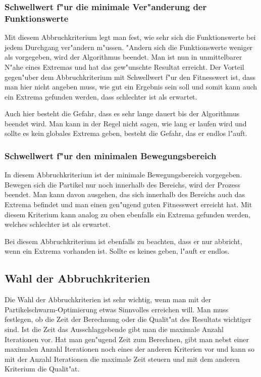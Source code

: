 \subsubsection{Schwellwert f"ur die minimale Ver"anderung der Funktionswerte}
Mit diesem Abbruchkriterium legt man fest, wie sehr sich die
Funktionswerte bei jedem Durchgang ver"andern m"ussen. "Andern sich die
Funktionswerte weniger als vorgegeben, wird der Algorithmus beendet. Man
ist nun in unmittelbarer N"ahe eines Extremas und hat das gew"unschte
Resultat erreicht. Der Vorteil gegen"uber dem Abbruchkriterium mit
Schwellwert f"ur den Fitnesswert ist, dass man hier nicht angeben muss,
wie gut ein Ergebnis sein soll und somit kann auch ein Extrema gefunden
werden, dass schlechter ist als erwartet. 

Auch hier besteht die Gefahr, dass es sehr lange dauert bis der Algorithmus
beendet wird. Man kann in der Regel nicht sagen, wie lang er laufen
wird und sollte es kein globales Extrema geben, besteht die Gefahr,
das er endlos l"auft.

\subsubsection{Schwellwert f"ur den minimalen Bewegungsbereich}
In diesem Abbruchkriterium ist der minimale Bewegungsbereich
vorgegeben. Bewegen sich die Partikel nur noch innerhalb des Bereichs,
wird der Prozess beendet. Man kann davon ausgehen, das sich innerhalb
des Bereichs auch das Extrema befindet und man einen gen"ugend guten
Fitnesswert erreicht hat. Mit diesem Kriterium kann analog zu oben
ebenfalls ein Extrema gefunden werden, welches schlechter ist als
erwartet.

Bei diesem Abbruchkriterium ist ebenfalls zu beachten, dass er nur
abbricht, wenn ein Extrema vorhanden ist. Sollte es keines geben, l"auft
er endlos.

\subsection{Wahl der Abbruchkriterien}
Die Wahl der Abbruchkriterien ist sehr wichtig, wenn man mit der
Partikelschwarm-Optimierung etwas Sinnvolles erreichen will. Man muss
festlegen, ob die Zeit der Berechnung oder die Qualit"at des Resultats
wichtiger sind. Ist die Zeit das Ausschlaggebende gibt man die maximale
Anzahl Iterationen vor. Hat man gen"ugend Zeit zum Berechnen, gibt
man nebst einer maximalen Anzahl Iterationen noch eines der anderen
Kriterien vor und kann so mit der Anzahl Iterationen die maximale Zeit
steuern und mit dem anderen Kriterium die Qualit"at.

